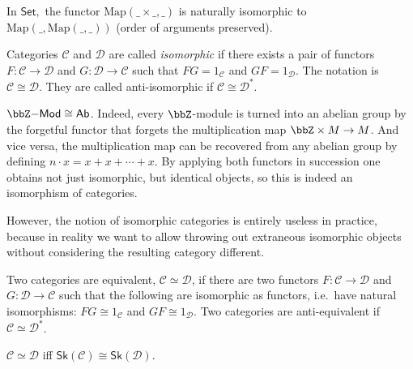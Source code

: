 %
\begin{example}
In $\mathsf{Set},$ the functor $\mathrm{Map}\left(\_\times\_,\_\right)$
is naturally isomorphic to $\mathrm{Map}\left(\_,\mathrm{Map}\left(\_,\_\right)\right)$
(order of arguments preserved).
\end{example}
\begin{defn}
Categories $\mathcal{C}$ and $\mathcal{D}$ are called \emph{isomorphic}
if there exists a pair of functors $F:\mathcal{C}\to\mathcal{D}$
and $G:\mathcal{D}\to\mathcal{C}$ such that $FG=1_{\mathcal{C}}$
and $GF=1_{\mathcal{D}}$. The notation is $\mathcal{C}\cong\mathcal{D}$.
They are called anti-isomorphic if $\mathcal{C}\cong\mathcal{D}^{\ast}$.
\end{defn}

\begin{example}
    $\bbZ\mathsf{-Mod}\cong \mathsf{Ab}$. Indeed, every $\bbZ$-module is turned into an abelian group by the forgetful functor that forgets the multiplication map $\bbZ\times M\to M$. And vice versa, the multiplication map can be recovered from any abelian group by defining $n\cdot x=x+x+\cdots +x$. By applying both functors in succession one obtains not just isomorphic, but identical objects, so this is indeed an isomorphism of categories.
\end{example}

However, the notion of isomorphic categories is entirely useless in
practice, because in reality we want to allow throwing out extraneous
isomorphic objects without considering the resulting category different.
\begin{defn}
 Two categories are equivalent, $\mathcal{C}\simeq\mathcal{D}$,
if there are two functors $F:\mathcal{C}\to\mathcal{D}$ and $G:\mathcal{D}\to\mathcal{C}$
such that the following are isomorphic as functors, i.e.\ have natural
isomorphisms: $FG\cong1_{\mathcal{C}}$ and $GF\cong1_{\mathcal{D}}$.
Two categories are anti-equivalent if $\mathcal{C}\simeq\mathcal{D}^{\ast}$.
\end{defn}
%
\begin{prop}
$\mathcal{C}\simeq\mathcal{D}$ iff $\mathsf{Sk}\left(\mathcal{C}\right)\cong\mathsf{Sk}\left(\mathcal{D}\right)$.
\end{prop}

